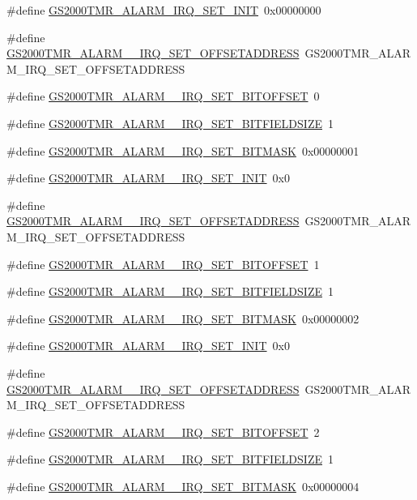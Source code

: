 \begin{DoxyCompactItemize}
\#define \hyperlink{a00556_a90a85a1548f0131ac459745e3f1a86cf}{GS2000TMR\_\-ALARM\_\-IRQ\_\-SET\_\-INIT}~0x00000000
\item 
\#define \hyperlink{a00556_a0df0fa1d965e60bfffec58f2728d9f58}{GS2000TMR\_\-ALARM\_\_\-IRQ\_\-SET\_\-OFFSETADDRESS}~GS2000TMR\_\-ALARM\_\-IRQ\_\-SET\_\-OFFSETADDRESS
\item 
\#define \hyperlink{a00556_a10fb554606f8f14b923347ec0d3afede}{GS2000TMR\_\-ALARM\_\_\-IRQ\_\-SET\_\-BITOFFSET}~0
\item 
\#define \hyperlink{a00556_a4c776f8336d255a857a96eaa70a2685f}{GS2000TMR\_\-ALARM\_\_\-IRQ\_\-SET\_\-BITFIELDSIZE}~1
\item 
\#define \hyperlink{a00556_a7685d1198d63ebdd99911197d249adca}{GS2000TMR\_\-ALARM\_\_\-IRQ\_\-SET\_\-BITMASK}~0x00000001
\item 
\#define \hyperlink{a00556_a47c160f0b7996bd38b46b69e35697fc6}{GS2000TMR\_\-ALARM\_\_\-IRQ\_\-SET\_\-INIT}~0x0
\item 
\#define \hyperlink{a00556_a22dad4d2fb0f32950789f151af615d6e}{GS2000TMR\_\-ALARM\_\_\-IRQ\_\-SET\_\-OFFSETADDRESS}~GS2000TMR\_\-ALARM\_\-IRQ\_\-SET\_\-OFFSETADDRESS
\item 
\#define \hyperlink{a00556_a13ede3af692d06fba4c2c3e50782c13f}{GS2000TMR\_\-ALARM\_\_\-IRQ\_\-SET\_\-BITOFFSET}~1
\item 
\#define \hyperlink{a00556_a72c1f0af769eb48d49e21324fb8a2136}{GS2000TMR\_\-ALARM\_\_\-IRQ\_\-SET\_\-BITFIELDSIZE}~1
\item 
\#define \hyperlink{a00556_a89956979e28eda0aad68e34d75fe5e3f}{GS2000TMR\_\-ALARM\_\_\-IRQ\_\-SET\_\-BITMASK}~0x00000002
\item 
\#define \hyperlink{a00556_a79113a6dfd2a1cf9b1a0892442c140e5}{GS2000TMR\_\-ALARM\_\_\-IRQ\_\-SET\_\-INIT}~0x0
\item 
\#define \hyperlink{a00556_a972a68cb49139e6b912526a1b89b33f3}{GS2000TMR\_\-ALARM\_\_\-IRQ\_\-SET\_\-OFFSETADDRESS}~GS2000TMR\_\-ALARM\_\-IRQ\_\-SET\_\-OFFSETADDRESS
\item 
\#define \hyperlink{a00556_a7eabfe4b2d32e3b1513645ef7f76f258}{GS2000TMR\_\-ALARM\_\_\-IRQ\_\-SET\_\-BITOFFSET}~2
\item 
\#define \hyperlink{a00556_a521dc5fd05a3c56c7230230c75ed3934}{GS2000TMR\_\-ALARM\_\_\-IRQ\_\-SET\_\-BITFIELDSIZE}~1
\item 
\#define \hyperlink{a00556_ad211e21254765e6a5de0d08f32d70c9d}{GS2000TMR\_\-ALARM\_\_\-IRQ\_\-SET\_\-BITMASK}~0x00000004
\item 

\end{DoxyCompactItemize}
